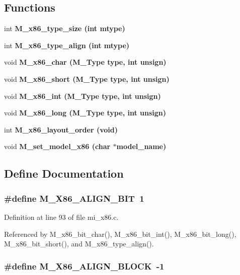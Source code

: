 \subsection*{Functions}
\begin{CompactItemize}
\item 
int \bf{M\_\-x86\_\-type\_\-size} (int mtype)
\item 
int \bf{M\_\-x86\_\-type\_\-align} (int mtype)
\item 
void \bf{M\_\-x86\_\-char} (\bf{M\_\-Type} type, int unsign)
\item 
void \bf{M\_\-x86\_\-short} (\bf{M\_\-Type} type, int unsign)
\item 
void \bf{M\_\-x86\_\-int} (\bf{M\_\-Type} type, int unsign)
\item 
void \bf{M\_\-x86\_\-long} (\bf{M\_\-Type} type, int unsign)
\item 
int \bf{M\_\-x86\_\-layout\_\-order} (void)
\item 
void \bf{M\_\-set\_\-model\_\-x86} (char $\ast$model\_\-name)
\end{CompactItemize}


\subsection{Define Documentation}
\subsubsection{\setlength{\rightskip}{0pt plus 5cm}\#define M\_\-X86\_\-ALIGN\_\-BIT~1}\label{mi__x86_8c_6a3cf9cb641a38f00f496402319a3d0f}




Definition at line 93 of file mi\_\-x86.c.

Referenced by M\_\-x86\_\-bit\_\-char(), M\_\-x86\_\-bit\_\-int(), M\_\-x86\_\-bit\_\-long(), M\_\-x86\_\-bit\_\-short(), and M\_\-x86\_\-type\_\-align().
\subsubsection{\setlength{\rightskip}{0pt plus 5cm}\#define M\_\-X86\_\-ALIGN\_\-BLOCK~-1}\label{mi__x86_8c_3068a03182423cfa8ea6a125777a95b5}




